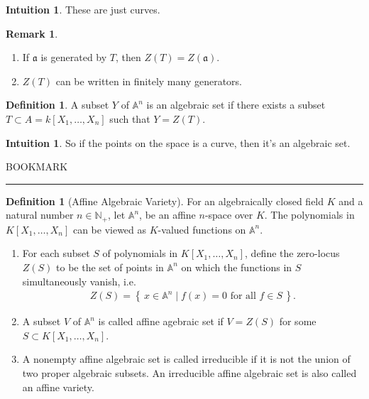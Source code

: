 \documentclass[11pt]{book}
\theoremstyle{definition}
\newtheorem{definition}[theorem]{Definition}
\newtheorem{remark}[theorem]{Remark}
\newtheorem{intuition}[theorem]{Intuition}
\numberwithin{equation}{section}
\newcommand{\makeset}[2]{\left\{\, #1 \mathrel{\mid} #2 \,\right\}}
\begin{document}
\begin{intbox}
    \begin{intuition}
        These are just curves.
    \end{intuition}
\end{intbox}

\begin{rembox}
\begin{remark}
    \begin{enumerate}
        \item If \(\mathfrak{a}\) is generated by \(T\), then \(Z(T) = Z(\mathfrak{a})\).
        \item \(Z(T)\) can be written in finitely many generators.
    \end{enumerate}
\end{remark}
\end{rembox}


\begin{defbox}
    \begin{definition}
        A subset \(Y\) of \(\mathbb{A}^n\) is an algebraic set if there exists a subset \(T \subset A = k[X_1, \ldots, X_n]\) such that \(Y = Z(T)\).
    \end{definition}
\end{defbox}
\begin{intbox}
    \begin{intuition}
        So if the points on the space is a curve, then it's an algebraic set.
    \end{intuition}
\end{intbox}
BOOKMARK
\newline
\rule{\textwidth}{0.4pt}
\newline
\begin{defbox}
    \begin{definition}[Affine Algebraic Variety]
        For an algebraically closed field \(K\) and a natural number \(n \in \mathbb{N}_+\), let \(\mathbb{A}^n\), be an affine \(n\)-space over \(K\). The polynomials in \(K[X_1, \ldots, X_n]\) can be viewed as \(K\)-valued functions on \(\mathbb{A}^n\).
        \begin{enumerate}
            \item For each subset \(S\) of polynomials in \(K[X_1, \ldots, X_n]\), define the zero-locus \(Z(S)\) to be the set of points in \(\mathbb{A}^n\) on which the functions in \(S\) simultaneously vanish, i.e.
            \begin{align*}
                Z(S) = \makeset{x \in \mathbb{A}^n}{f(x) = 0 \text{ for all } f \in S} \text{.}
            \end{align*}
            \item A subset \(V\) of \(\mathbb{A}^n\) is called affine agebraic set if \(V = Z(S)\) for some \(S \subset K[X_1, \ldots, X_n]\).
            \item A nonempty affine algebraic set is called irreducible if it is not the union of two proper algebraic subsets. An irreducible affine algebraic set is also called an affine variety.
        \end{enumerate}
    \end{definition}
\end{defbox}
\end{document}
